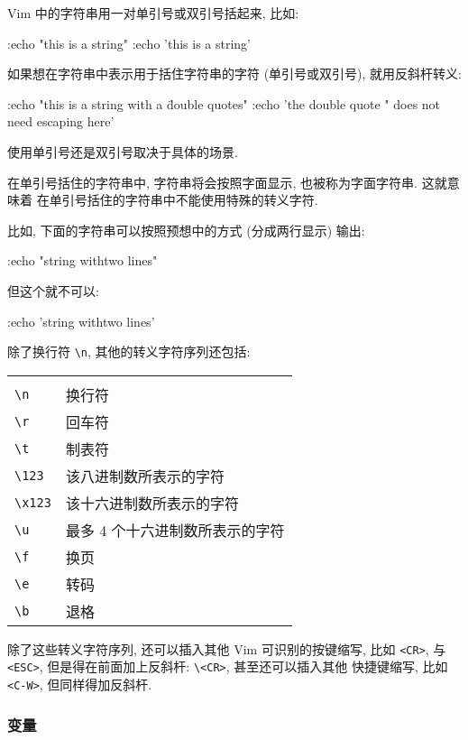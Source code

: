Vim 中的字符串用一对单引号或双引号括起来, 比如:
\begin{vimcode}
:echo "this is a string"
:echo 'this is a string'
\end{vimcode}

如果想在字符串中表示用于括住字符串的字符 (单引号或双引号), 就用反斜杆转义:
\begin{vimcode}
:echo "this is a string with a \" double quotes"
:echo 'the double quote " does not need escaping here'
\end{vimcode}

使用单引号还是双引号取决于具体的场景.

在单引号括住的字符串中, 字符串将会按照字面显示, 也被称为字面字符串. 这就意味着
在单引号括住的字符串中不能使用特殊的转义字符.

比如, 下面的字符串可以按照预想中的方式 (分成两行显示) 输出:
\begin{vimcode}
:echo "string with\n two lines"
\end{vimcode}
但这个就不可以:
\begin{vimcode}
:echo 'string with\n two lines'
\end{vimcode}

除了换行符 \verb'\n', 其他的转义字符序列还包括:

\begin{center}
\begin{tabular}{ll}
   \hline \\
   \verb'\n'    & 换行符 \\
   \verb'\r'    & 回车符 \\
   \verb'\t'    & 制表符 \\
   \verb'\123'  & 该八进制数所表示的字符 \\
   \verb'\x123' & 该十六进制数所表示的字符 \\
   \verb'\u'    & 最多 4 个十六进制数所表示的字符 \\
   \verb'\f'    & 换页 \\
   \verb'\e'    & 转码 \\
   \verb'\b'    & 退格 \\
   \hline
\end{tabular}
\end{center}

除了这些转义字符序列, 还可以插入其他 Vim 可识别的按键缩写, 比如 \texttt{<CR>},
与 \texttt{<ESC>}, 但是得在前面加上反斜杆: \verb'\<CR>', 甚至还可以插入其他
快捷键缩写, 比如 \texttt{<C-W>}, 但同样得加反斜杆.

\subsubsection{变量}
\label{subsubsec:variables}

